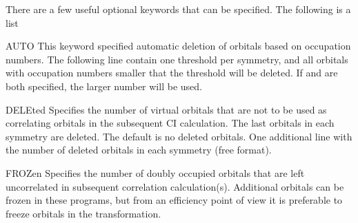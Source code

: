 There are a few useful optional keywords that can be specified.
The following is a list
\begin{keywordlist}
\item[AUTO]
This keyword specified automatic deletion of orbitals based on
occupation numbers. The following line contain one
threshold per symmetry, and all orbitals with occupation
numbers smaller that the threshold will be deleted.
If  and  are both specified,
the larger number will be used.
\item[DELEted]
Specifies the number of virtual orbitals that are not to be used as
correlating orbitals in the subsequent CI calculation. The last
orbitals in each symmetry are deleted. The default is no deleted
orbitals.
One additional line with the number of deleted orbitals in each
symmetry (free format).
\item[FROZen]
Specifies the number of doubly occupied orbitals that are left
uncorrelated in subsequent correlation calculation(s). Additional orbitals can
be frozen in these programs, but from an efficiency point of view it
is preferable to freeze orbitals in the transformation.

\end{keywordlist}
